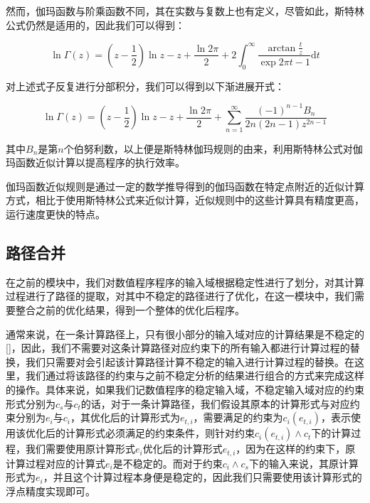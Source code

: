 \begin{itemize}
  然而，伽玛函数与阶乘函数不同，其在实数与复数上也有定义，尽管如此，斯特林公式仍然是适用的，因此我们可以得到：
  
  \begin{equation*}
    \ln \Gamma(z) = (z-\frac{1}{2})\ln z - z + \frac{\ln 2 \pi}{2} + 2 \int_{0}^{\infty}\frac{\arctan \frac{t}{z}}{\exp{2\pi t}-1} \mathrm{d} t
  \end{equation*}

  对上述式子反复进行分部积分，我们可以得到以下渐进展开式：

  \begin{equation*}
    \ln \Gamma(z) = (z-\frac{1}{2})\ln z - z + \frac{\ln 2 \pi}{2} + \sum_{n=1}^{\infty}\frac{(-1)^{n-1}B_n}{2n(2n-1)z^{2n-1}}
  \end{equation*}

  其中$B_n$是第$n$个伯努利数，以上便是斯特林伽玛规则的由来，利用斯特林公式对伽玛函数近似计算以提高程序的执行效率。

  伽玛函数近似规则是通过一定的数学推导得到的伽玛函数在特定点附近的近似计算方式，相比于使用斯特林公式来近似计算，近似规则中的这些计算具有精度更高，运行速度更快的特点。

\end{itemize}

\subsection{路径合并}

在之前的模块中，我们对数值程序程序的输入域根据稳定性进行了划分，对其计算过程进行了路径的提取，对其中不稳定的路径进行了优化，在这一模块中，我们需要整合之前的优化结果，得到一个整体的优化后程序。

通常来说，在一条计算路径上，只有很小部分的输入域对应的计算结果是不稳定的[]，因此，我们不需要对这条计算路径对应约束下的所有输入都进行计算过程的替换，我们只需要对会引起该计算路径计算不稳定的输入进行计算过程的替换。在这里，我们通过将该路径的约束与之前不稳定分析的结果进行组合的方式来完成这样的操作。具体来说，如果我们记数值程序的稳定输入域，不稳定输入域对应的约束形式分别为$c_s$与$c_t$的话，对于一条计算路径，我们假设其原本的计算形式与对应约束分别为$e_i$与$c_i$，其优化后的计算形式为$e_{t,i}$，需要满足的约束为$c_i(e_{t,i})$，表示使用该优化后的计算形式必须满足的约束条件，则针对约束$c_i(e_{t,i})\wedge c_t$下的计算过程，我们需要使用原计算形式$e_i$优化后的计算形式$e_{t,i}$，因为在这样的约束下，原计算过程对应的计算式$e_i$是不稳定的。而对于约束$c_i \wedge c_s$下的输入来说，其原计算形式为$e_i$，并且这个计算过程本身便是稳定的，因此我们只需要使用该计算形式的浮点精度实现即可。

